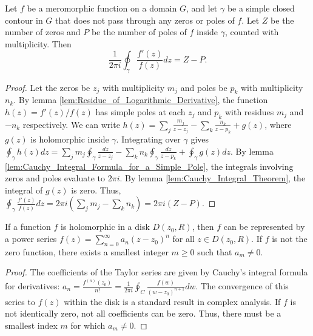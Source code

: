 \begin{lemma}
    \label{lem:Argument_Principle}
    Let $f$ be a meromorphic function on a domain $G$, and let $\gamma$ be a simple closed contour in $G$ that does not pass through any zeros or poles of $f$. Let $Z$ be the number of zeros and $P$ be the number of poles of $f$ inside $\gamma$, counted with multiplicity. Then
    $$ \frac{1}{2\pi i} \oint_\gamma \frac{f'(z)}{f(z)} dz = Z - P. $$
\end{lemma}

\begin{proof}
    Let the zeros be $z_j$ with multiplicity $m_j$ and poles be $p_k$ with multiplicity $n_k$. By lemma \ref{lem:Residue_of_Logarithmic_Derivative}, the function $h(z) = f'(z)/f(z)$ has simple poles at each $z_j$ and $p_k$ with residues $m_j$ and $-n_k$ respectively. We can write $h(z) = \sum_j \frac{m_j}{z-z_j} - \sum_k \frac{n_k}{z-p_k} + g(z)$, where $g(z)$ is holomorphic inside $\gamma$. Integrating over $\gamma$ gives $\oint_\gamma h(z) dz = \sum_j m_j \oint_\gamma \frac{dz}{z-z_j} - \sum_k n_k \oint_\gamma \frac{dz}{z-p_k} + \oint_\gamma g(z) dz$. By lemma \ref{lem:Cauchy_Integral_Formula_for_a_Simple_Pole}, the integrals involving zeros and poles evaluate to $2\pi i$. By lemma \ref{lem:Cauchy_Integral_Theorem}, the integral of $g(z)$ is zero. Thus, $\oint_\gamma \frac{f'(z)}{f(z)} dz = 2\pi i (\sum_j m_j - \sum_k n_k) = 2\pi i (Z - P)$.
\end{proof}

\begin{lemma}
    \label{lem:Taylor_Series_Expansion}
    If a function $f$ is holomorphic in a disk $D(z_0, R)$, then $f$ can be represented by a power series $f(z) = \sum_{n=0}^\infty a_n (z-z_0)^n$ for all $z \in D(z_0, R)$. If $f$ is not the zero function, there exists a smallest integer $m \ge 0$ such that $a_m \neq 0$.
\end{lemma}

\begin{proof}
    The coefficients of the Taylor series are given by Cauchy's integral formula for derivatives: $a_n = \frac{f^{(n)}(z_0)}{n!} = \frac{1}{2\pi i} \oint_C \frac{f(w)}{(w-z_0)^{n+1}} dw$. The convergence of this series to $f(z)$ within the disk is a standard result in complex analysis. If $f$ is not identically zero, not all coefficients can be zero. Thus, there must be a smallest index $m$ for which $a_m \neq 0$.
\end{proof}

